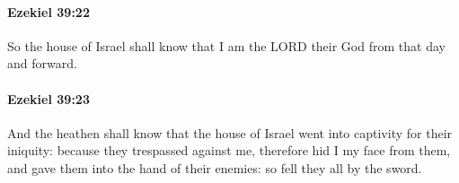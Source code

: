 		\paragraph{Ezekiel 39:22} %
			\label{EZEKIEL-39-22}

			So the house of Israel shall know that I am the LORD their God from that day and forward.


		\paragraph{Ezekiel 39:23} %
			\label{EZEKIEL-39-23}

			And the heathen shall know that the house of Israel went into captivity for their iniquity: because they trespassed against me, therefore hid I my face from them, and gave them into the hand of their enemies: so fell they all by the sword.


